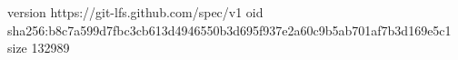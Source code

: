 version https://git-lfs.github.com/spec/v1
oid sha256:b8c7a599d7fbc3cb613d4946550b3d695f937e2a60c9b5ab701af7b3d169e5c1
size 132989
